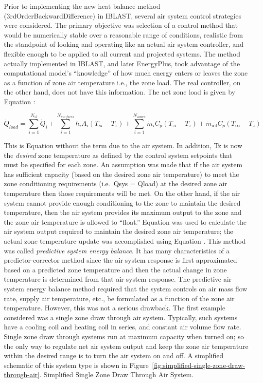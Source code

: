 Prior to implementing the new heat balance method (3rdOrderBackwardDifference) in IBLAST, several air system control strategies were considered. The primary objective was selection of a control method that would be numerically stable over a reasonable range of conditions, realistic from the standpoint of looking and operating like an actual air system controller, and flexible enough to be applied to all current and projected systems. The method actually implemented in IBLAST, and later EnergyPlus, took advantage of the computational model's ``knowledge'' of how much energy enters or leaves the zone as a function of zone air temperature i.e., the zone load. The real controller, on the other hand, does not have this information. The net zone load is given by Equation :

\begin{equation}
{\dot Q_{load}} = \sum\limits_{i = 1}^{{N_{sl}}} {\dot Q_i^{}}  + \sum\limits_{i = 1}^{{N_{surfaces}}} {{h_i}} {A_i}\left( {{T_{si}} - {T_z}} \right) + \sum\limits_{i = 1}^{{N_{zones}}} {{{\dot m}_i}} {C_p}\left( {{T_{zi}} - {T_z}} \right) + {\dot m_{\inf }}{C_p}\left( {{T_\infty } - {T_z}} \right)
\end{equation}

This is Equation without the term due to the air system. In addition, Tz is now the \emph{desired} zone temperature as defined by the control system setpoints that must be specified for each zone. An assumption was made that if the air system has sufficient capacity (based on the desired zone air temperature) to meet the zone conditioning requirements (i.e.~Qsys = Qload) at the desired zone air temperature then those requirements will be met. On the other hand, if the air system cannot provide enough conditioning to the zone to maintain the desired temperature, then the air system provides its maximum output to the zone and the zone air temperature is allowed to ``float.'' Equation was used to calculate the air system output required to maintain the desired zone air temperature; the actual zone temperature update was accomplished using Equation . This method was called \emph{predictive system energy balance}. It has many characteristics of a predictor-corrector method since the air system response is first approximated based on a predicted zone temperature and then the actual change in zone temperature is determined from that air system response. The predictive air system energy balance method required that the system controls on air mass flow rate, supply air temperature, etc., be formulated as a function of the zone air temperature. However, this was not a serious drawback. The first example considered was a single zone draw through air system. Typically, such systems have a cooling coil and heating coil in series, and constant air volume flow rate. Single zone draw through systems run at maximum capacity when turned on; so the only way to regulate net air system output and keep the zone air temperature within the desired range is to turn the air system on and off. A simplified schematic of this system type is shown in Figure~\ref{fig:simplified-single-zone-draw-through-air}. Simplified Single Zone Draw Through Air System.


